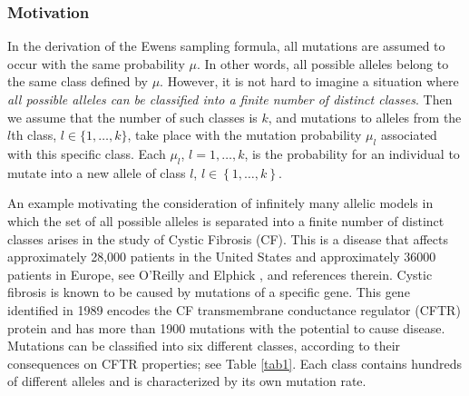 \documentclass[12pt]{amsart}
\theoremstyle{definition}
\numberwithin{equation}{section}
\begin{document}
\subsubsection{Motivation}
In the derivation of the Ewens sampling formula, all mutations are assumed to occur with the same probability $\mu$. In other words, all possible alleles belong to the same class defined by $\mu$. However, it is not hard to imagine a situation where\textit{ all possible alleles can be classified into a finite number of distinct classes}.  Then we assume that the number of such classes is $k$,  and mutations to alleles from the $l$th class, $l\in \{1,\ldots,k\}$, take place with the mutation probability $\mu_l$  associated with this
specific class. Each $\mu_l$, $l=1,\ldots, k$,
is the probability for an individual to mutate into a new allele of class $l$,
$l\in\left\{1,\ldots,k\right\}$.

An example motivating the consideration of infinitely many allelic models
in which the set of all possible alleles is separated into a finite number of distinct classes arises in the study of
Cystic Fibrosis (CF). This is a disease that affects approximately 28,000 patients
in the United States and approximately 36000 patients in Europe, see
O'Reilly and Elphick \cite{ReillyElphick}, and references therein.
Cystic fibrosis is known to be caused by mutations of a specific gene.
This gene identified in 1989 encodes the CF transmembrane conductance regulator
(CFTR) protein and has more than 1900 mutations with the potential to cause
disease. Mutations can be classified into six different classes, according to their
consequences on CFTR properties; see Table \ref{tab1}. Each class
contains hundreds of different alleles and is characterized by its own mutation rate.
\end{document}
